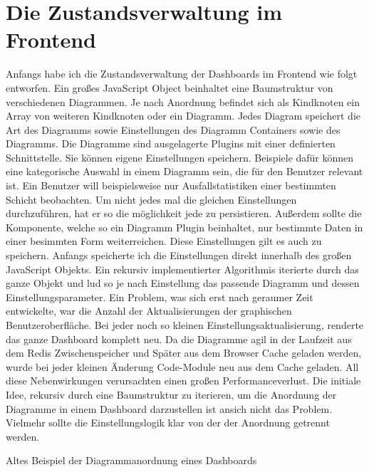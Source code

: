 \section{Die Zustandsverwaltung im Frontend}
Anfangs habe ich die Zustandsverwaltung der Dashboards im Frontend wie
folgt entworfen. Ein großes JavaScript Object beinhaltet eine Baumstruktur
von verschiedenen Diagrammen. Je nach Anordnung befindet sich als Kindknoten
ein Array von weiteren Kindknoten oder ein Diagramm. Jedes Diagram speichert
die Art des Diagramms sowie Einstellungen des Diagramm Containers sowie des
Diagramms. Die Diagramme sind ausgelagerte Plugins mit einer definierten
Schnittstelle. Sie können eigene Einstellungen speichern. Beispiele dafür
können eine kategorische Auswahl in einem Diagramm sein, die für den Benutzer
relevant ist. Ein Benutzer will beispielsweise nur Ausfallstatistiken einer
bestimmten Schicht beobachten. Um nicht jedes mal die gleichen Einstellungen
durchzuführen, hat er so die möglichkeit jede zu persistieren. Außerdem sollte
die Komponente, welche so ein Diagramm Plugin beinhaltet, nur bestimmte Daten
in einer besimmten Form weiterreichen. Diese Einstellungen gilt es auch zu speichern.
Anfangs speicherte ich die Einstellungen direkt innerhalb des großen JavaScript Objekts.
Ein rekursiv implementierter Algorithmis iterierte durch das ganze Objekt und lud so 
je nach Einstellung das passende Diagramm und dessen Einstellungsparameter. Ein Problem,
was sich erst nach geraumer Zeit entwickelte, war die Anzahl der Aktualisierungen
der graphischen Benutzeroberfläche. Bei jeder noch so kleinen Einstellungsaktualisierung,
renderte das ganze Dashboard komplett neu. Da die Diagramme agil in der Laufzeit aus dem
Redis Zwischenspeicher und Später aus dem Browser Cache geladen werden, wurde bei jeder
kleinen Änderung Code-Module neu aus dem Cache geladen. All diese Nebenwirkungen
verursachten einen großen Performanceverlust. Die initiale Idee, rekursiv durch
eine Baumstruktur zu iterieren, um die Anordnung der Diagramme in einem Dashboard
darzustellen ist ansich nicht das Problem. Vielmehr sollte die Einstellungslogik klar
von der der Anordnung getrennt werden.  

\begin{listing}
    \label{lst:HelloJSX}
    \caption{Altes Beispiel der Diagrammanordnung eines Dashboards }
    \inputminted{jsx}{snippets/json/OldArrangement.json}
\end{listing}

